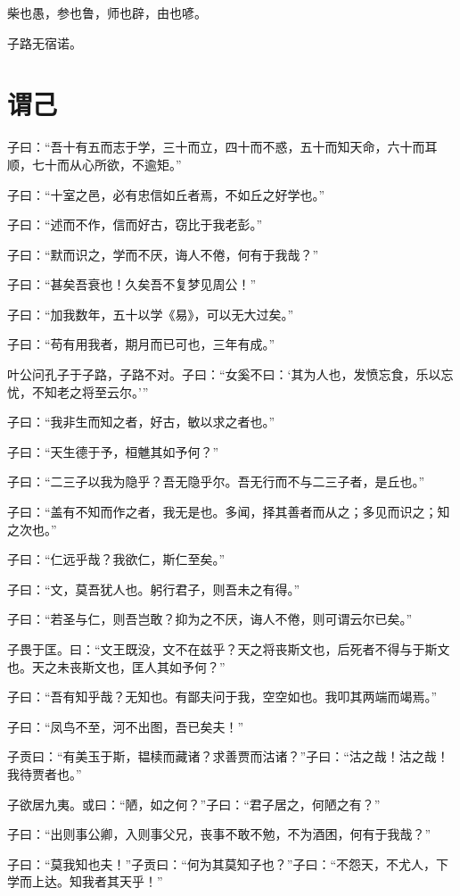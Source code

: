 \documentclass[a5paper]{ctexbook}
\begin{document}
    柴也愚，参也鲁，师也辟，由也喭。

    子路无宿诺。

    \chapter{谓己}

    子曰：“吾十有五而志于学，三十而立，四十而不惑，五十而知天命，六十而耳顺，七十而从心所欲，不逾矩。”

    子曰：“十室之邑，必有忠信如丘者焉，不如丘之好学也。”

    子曰：“述而不作，信而好古，窃比于我老彭。”

    子曰：“默而识之，学而不厌，诲人不倦，何有于我哉？”

    子曰：“甚矣吾衰也！久矣吾不复梦见周公！”

    子曰：“加我数年，五十以学《易》，可以无大过矣。”

    子曰：“苟有用我者，期月而已可也，三年有成。”

    叶公问孔子于子路，子路不对。子曰：“女奚不曰：‘其为人也，发愤忘食，乐以忘忧，不知老之将至云尔。’”

    子曰：“我非生而知之者，好古，敏以求之者也。”

    子曰：“天生德于予，桓魋其如予何？”

    子曰：“二三子以我为隐乎？吾无隐乎尔。吾无行而不与二三子者，是丘也。”

    子曰：“盖有不知而作之者，我无是也。多闻，择其善者而从之；多见而识之；知之次也。”

    子曰：“仁远乎哉？我欲仁，斯仁至矣。”

    子曰：“文，莫吾犹人也。躬行君子，则吾未之有得。”

    子曰：“若圣与仁，则吾岂敢？抑为之不厌，诲人不倦，则可谓云尔已矣。”

    子畏于匡。曰：“文王既没，文不在兹乎？天之将丧斯文也，后死者不得与于斯文也。天之未丧斯文也，匡人其如予何？”

    子曰：“吾有知乎哉？无知也。有鄙夫问于我，空空如也。我叩其两端而竭焉。”

    子曰：“凤鸟不至，河不出图，吾已矣夫！”

    子贡曰：“有美玉于斯，韫椟而藏诸？求善贾而沽诸？”子曰：“沽之哉！沽之哉！我待贾者也。”

    子欲居九夷。或曰：“陋，如之何？”子曰：“君子居之，何陋之有？”

    子曰：“出则事公卿，入则事父兄，丧事不敢不勉，不为酒困，何有于我哉？”

    子曰：“莫我知也夫！”子贡曰：“何为其莫知子也？”子曰：“不怨天，不尤人，下学而上达。知我者其天乎！”
\end{document}
